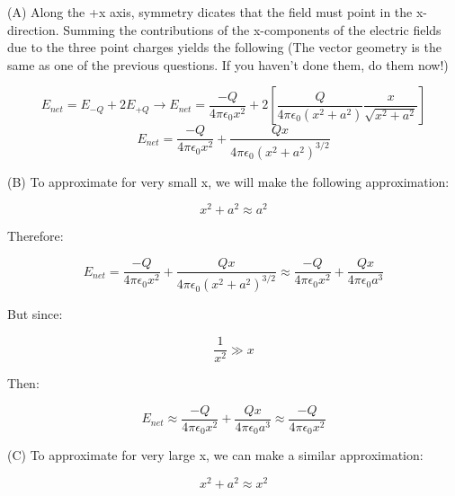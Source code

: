 \begin{solution}

(A) Along the +x axis, symmetry dicates that the field must point in the x-direction. Summing the contributions of the x-components of the electric fields due to the three point charges yields the following (The vector geometry is the same as one of the previous questions. If you haven't done them, do them now!)

\begin{equation*}
    E_{net} = E_{-Q} + 2E_{+Q} \rightarrow
    E_{net} = \frac{-Q}{4\pi\epsilon_0x^2}
              +2[\frac{Q}{4\pi\epsilon_0(x^2+a^2)}
                 \frac{x}{\sqrt{x^2+a^2}}]
\end{equation*}
\begin{equation*}
    E_{net} = \frac{-Q}{4\pi\epsilon_0x^2} +
              \frac{Qx}{4\pi\epsilon_0(x^2+a^2)^{3/2}}
\end{equation*}

(B) To approximate for very small x, we will make the following approximation:

\begin{equation*}
    x^2+a^2\approx a^2
\end{equation*}

Therefore:

\begin{equation*}
    E_{net} = \frac{-Q}{4\pi\epsilon_0x^2} +
              \frac{Qx}{4\pi\epsilon_0(x^2+a^2)^{3/2}}
            \approx
            \frac{-Q}{4\pi\epsilon_0x^2} +
              \frac{Qx}{4\pi\epsilon_0 a^3}
\end{equation*}

But since:

\begin{equation*}
    \frac{1}{x^2} \gg x
\end{equation*}

Then:

\begin{equation*}
    E_{net} \approx 
                \frac{-Q}{4\pi\epsilon_0x^2} +
                \frac{Qx}{4\pi\epsilon_0 a^3}
            \approx
                \frac{-Q}{4\pi\epsilon_0x^2}
              
\end{equation*}

(C) To approximate for very large x, we can make a similar approximation:

\begin{equation*}
    x^2+a^2 \approx x^2
\end{equation*}


\end{solution}
